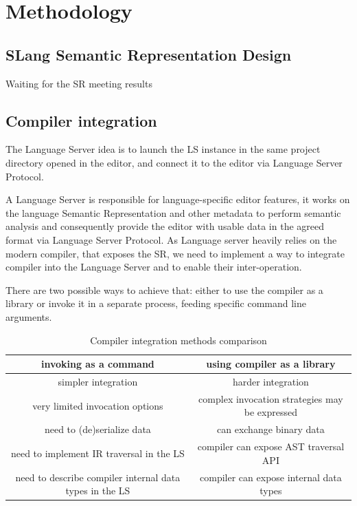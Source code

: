 \chapter{Methodology}
\label{chap:met}

\section{SLang Semantic Representation Design}
\label{sec:met:ir_design}
Waiting for the SR meeting results

\section{Compiler integration}
\label{sec:met:ls_compiler_interop}
The Language Server idea is to launch the LS instance in the same project directory
opened in the editor, and connect it to the editor via Language Server Protocol.

A Language Server is responsible for language-specific editor features, 
it works on the language Semantic Representation and other metadata 
to perform semantic analysis and consequently provide the editor with usable data in the agreed format via Language Server Protocol.
As Language server heavily relies on the modern compiler, that exposes the SR, 
we need to implement a way to integrate compiler into the Language Server and to enable their inter-operation.

There are two possible ways to achieve that: either to use the compiler as a library or invoke it in a separate process, 
feeding specific command line arguments.
\begin{table}[H]
    \centering
    \begin{tabular}{|c|c|}
        \hline
        \textbf{invoking as a command} & \textbf{using compiler as a library} \\
        \hline
        simpler integration & harder integration \\ 
        \hline
        very limited invocation options & complex invocation strategies may be expressed \\
        \hline
        need to (de)serialize data & can exchange binary data \\
        \hline
        need to implement IR traversal in the LS & compiler can expose AST traversal API \\
        \hline
        need to describe compiler internal data types in the LS & compiler can expose internal data types \\
        \hline 
    \end{tabular}
    \caption{Compiler integration methods comparison}
    \label{table:met:compiler_integration}
\end{table}

